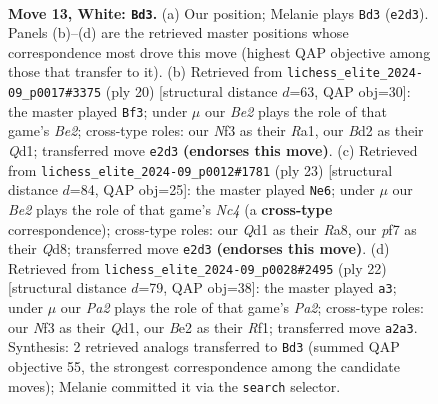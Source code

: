 \documentclass[11pt]{article}
\begin{document}
\clearpage

\begin{figure}[p]\centering
\begin{subfigure}{0.46\textwidth}\centering
\resizebox{\linewidth}{!}{%
\newchessgame
\chessboard[
  setfen={rn3rk1/1p1b1ppp/p1q1pn2/8/1b6/2N1PN2/PP1BBPPP/R2Q1RK1 w - - 6 13},
  showmover=false,
  pgfstyle=straightmove, color=movearrow, markmove={e2-d3}
]}
\caption{}
\end{subfigure}\hfill
\begin{subfigure}{0.46\textwidth}\centering
\resizebox{\linewidth}{!}{%
\newchessgame
\chessboard[
  setfen={r1bq1rk1/pp3ppp/1bn2n2/3p4/3N4/P1N1B3/1PP1BPPP/R2Q1RK1 w - - 6 11},
  showmover=false,
  pgfstyle=straightmove, color=movearrow, markmove={e2-f3}
]}
\caption{}
\end{subfigure}
\\[4pt]
\begin{subfigure}{0.46\textwidth}\centering
\resizebox{\linewidth}{!}{%
\newchessgame
\chessboard[
  setfen={r2q1rk1/pp2bppp/5n2/2np4/5Bb1/2N2NP1/PPQ1PPBP/R4RK1 b - - 3 12},
  showmover=false,
  pgfstyle=straightmove, color=movearrow, markmove={c5-e6}
]}
\caption{}
\end{subfigure}\hfill
\begin{subfigure}{0.46\textwidth}\centering
\resizebox{\linewidth}{!}{%
\newchessgame
\chessboard[
  setfen={r4rk1/pp3ppp/2n1pn2/q7/1b1P2b1/2N1BN2/PP2BPPP/2RQ1RK1 w - - 8 12},
  showmover=false,
  pgfstyle=straightmove, color=movearrow, markmove={a2-a3}
]}
\caption{}
\end{subfigure}
\caption{\textbf{Move 13, White: \texttt{Bd3}.} (a) Our position; Melanie plays \texttt{Bd3} (\texttt{e2d3}). Panels (b)--(d) are the retrieved master positions whose correspondence most drove this move (highest QAP objective among those that transfer to it). (b) Retrieved from \texttt{lichess\_elite\_2024-09\_p0017\#3375} (ply 20) [structural distance $d$=63, QAP obj=30]: the master played \texttt{Bf3}; under $\mu$ our \emph{Be2} plays the role of that game's \emph{Be2}; cross-type roles: our \emph{N}f3 as their \emph{R}a1, our \emph{B}d2 as their \emph{Q}d1; transferred move \texttt{e2d3} \textbf{(endorses this move)}. (c) Retrieved from \texttt{lichess\_elite\_2024-09\_p0012\#1781} (ply 23) [structural distance $d$=84, QAP obj=25]: the master played \texttt{Ne6}; under $\mu$ our \emph{Be2} plays the role of that game's \emph{Nc4} (a \textbf{cross-type} correspondence); cross-type roles: our \emph{Q}d1 as their \emph{R}a8, our \emph{p}f7 as their \emph{Q}d8; transferred move \texttt{e2d3} \textbf{(endorses this move)}. (d) Retrieved from \texttt{lichess\_elite\_2024-09\_p0028\#2495} (ply 22) [structural distance $d$=79, QAP obj=38]: the master played \texttt{a3}; under $\mu$ our \emph{Pa2} plays the role of that game's \emph{Pa2}; cross-type roles: our \emph{N}f3 as their \emph{Q}d1, our \emph{B}e2 as their \emph{R}f1; transferred move \texttt{a2a3}. Synthesis: 2 retrieved analogs transferred to \texttt{Bd3} (summed QAP objective 55, the strongest correspondence among the candidate moves); Melanie committed it via the \texttt{search} selector.}
\label{fig:thought-m24}
\end{figure}
\end{document}
